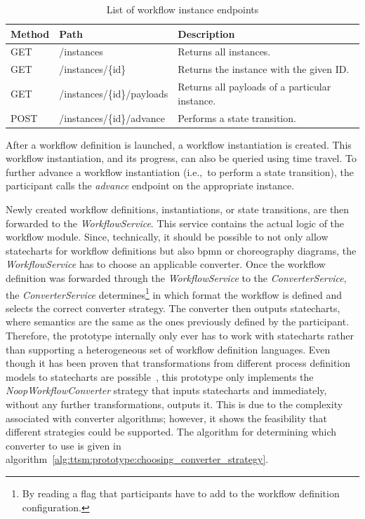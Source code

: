 \begin{table}[h]
\centering
\begin{tabular}{|l|l|l|}
    \hline
    \textbf{Method} & \textbf{Path} & \textbf{Description}\\
    \hline
    GET & /instances & Returns all instances.\\
    GET & /instances/\{id\} & Returns the instance with the given ID.\\
    GET & /instances/\{id\}/payloads & Returns all payloads of a particular instance.\\
    POST & /instances/\{id\}/advance & Performs a state transition.\\
    \hline
\end{tabular}
\caption{List of workflow instance endpoints}
\label{tab:ttsm:prototype:workflow_instance_endpoints}
\end{table}

After a workflow definition is launched, a workflow instantiation is created. This workflow instantiation, and its progress, can also be queried using time travel. To further advance a workflow instantiation (i.e.,\ to perform a state transition), the participant calls the \textit{advance} endpoint on the appropriate instance.

Newly created workflow definitions, instantiations, or state transitions, are then forwarded to the \textit{WorkflowService}. This service contains the actual logic of the workflow module. Since, technically, it should be possible to not only allow statecharts for workflow definitions but also \gls{bpmn} or choreography diagrams, the \textit{WorkflowService} has to choose an applicable converter. Once the workflow definition was forwarded through the \textit{WorkflowService} to the \textit{ConverterService}, the \textit{ConverterService} determines\footnote{By reading a flag that participants have to add to the workflow definition configuration.} in which format the workflow is defined and selects the correct converter strategy. The converter then outputs statecharts, where semantics are the same as the ones previously defined by the participant. Therefore, the prototype internally only ever has to work with statecharts rather than supporting a heterogeneous set of workflow definition languages. Even though it has been proven that transformations from different process definition models to statecharts are possible~\cite{sequence_diagrams_to_statecharts,inter_organizational_bps_managed_by_blockchain}, this prototype only implements the \textit{NoopWorkflowConverter} strategy that inputs statecharts and immediately, without any further transformations, outputs it. This is due to the complexity associated with converter algorithms; however, it shows the feasibility that different strategies could be supported. The algorithm for determining which converter to use is given in algorithm~\ref{alg:ttsm:prototype:choosing_converter_strategy}.

